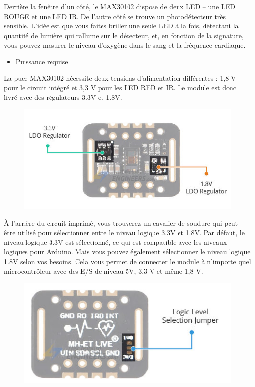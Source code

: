 \begin{flushleft}
		Derrière la fenêtre d’un côté, le MAX30102 dispose de deux LED – une LED ROUGE et une LED IR. De l’autre côté se trouve un photodétecteur très sensible. L’idée est que vous faites briller une seule LED à la fois, détectant la quantité de lumière qui rallume sur le détecteur, et, en fonction de la signature, vous pouvez mesurer le niveau d’oxygène dans le sang et la fréquence cardiaque.\newline
		\newpage
	\begin{itemize}
		\item {\Large  Puissance requise}
	\end{itemize}
	La puce MAX30102 nécessite deux tensions d’alimentation différentes : 1,8 V pour le circuit intégré et 3,3 V pour les LED RED et IR. Le module est donc livré avec des régulateurs 3.3V et 1.8V.
	\begin{figure}[h]
		\centering
		\includegraphics{chapitres/images/Capteur3.PNG}
		\label{fig:labelname}
	\end{figure}
	À l’arrière du circuit imprimé, vous trouverez un cavalier de soudure qui peut être utilisé pour sélectionner entre le niveau logique 3.3V et 1.8V. Par défaut, le niveau logique 3.3V est sélectionné, ce qui est compatible avec les niveaux logiques pour Arduino. Mais vous pouvez également sélectionner le niveau logique 1.8V selon vos besoins. Cela vous permet de connecter le module à n’importe quel microcontrôleur avec des E/S de niveau 5V, 3,3 V et même 1,8 V.
	\begin{figure}[h]
		\centering
		\includegraphics{chapitres/images/Capteur4.PNG}

\end{figure}
\end{flushleft}
